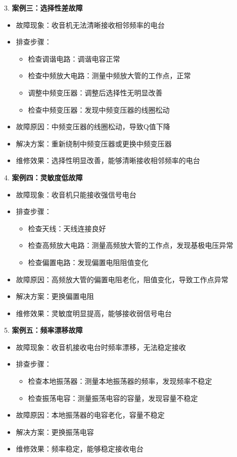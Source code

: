 \documentclass[12pt,UTF8]{ctexbook}
\begin{document}
3. \textbf{案例三：选择性差故障}
   \begin{itemize}[leftmargin=3.5em]
   \item 故障现象：收音机无法清晰接收相邻频率的电台
   \item 排查步骤：
     \begin{itemize}
     \item 检查调谐电路：调谐电容正常
     \item 检查中频放大电路：测量中频放大管的工作点，正常
     \item 调整中频变压器：调整后选择性无明显改善
     \item 检查中频变压器：发现中频变压器的线圈松动
     \end{itemize}
   \item 故障原因：中频变压器的线圈松动，导致Q值下降
   \item 解决方案：重新绕制中频变压器或更换中频变压器
   \item 维修效果：选择性明显改善，能够清晰接收相邻频率的电台
   \end{itemize}

4. \textbf{案例四：灵敏度低故障}
   \begin{itemize}[leftmargin=3.5em]
   \item 故障现象：收音机只能接收强信号电台
   \item 排查步骤：
     \begin{itemize}
     \item 检查天线：天线连接良好
     \item 检查高频放大电路：测量高频放大管的工作点，发现基极电压异常
     \item 检查偏置电路：发现偏置电阻阻值变化
     \end{itemize}
   \item 故障原因：高频放大管的偏置电阻老化，阻值变化，导致工作点异常
   \item 解决方案：更换偏置电阻
   \item 维修效果：灵敏度明显提高，能够接收弱信号电台
   \end{itemize}

5. \textbf{案例五：频率漂移故障}
   \begin{itemize}[leftmargin=3.5em]
   \item 故障现象：收音机接收电台时频率漂移，无法稳定接收
   \item 排查步骤：
     \begin{itemize}
     \item 检查本地振荡器：测量本地振荡器的频率，发现频率不稳定
     \item 检查振荡电容：测量振荡电容的容量，发现容量不稳定
     \end{itemize}
   \item 故障原因：本地振荡器的电容老化，容量不稳定
   \item 解决方案：更换振荡电容
   \item 维修效果：频率稳定，能够稳定接收电台
   \end{itemize}
\end{document}
